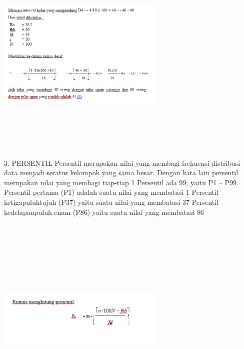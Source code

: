 \documentclass[11pt,fleqn]{book} %
\begin{document}
{\includegraphics[width = 8cm, height= 10cm]{Pictures/rizkie6.png}

3. PERSENTIL
Persentil merupakan nilai yang membagi frekuensi distribusi data menjadi seratus kelompok yang sama besar. Dengan kata lain persentil merupakan nilai yang membagi tiap-tiap 1%
Persentil ada 99, yaitu P1 – P99.
Persentil pertama (P1) adalah suatu nilai yang membatasi 1%
Persentil ketigapuluhtujuh (P37) yaitu suatu nilai yang membatasi 37%
Persentil kedelapanpuluh enam (P86) yaitu suatu nilai yang membatasi 86%

\includegraphics[width = 8cm, height= 10cm]{Pictures/rizkie7.png}

}
\end{document}
